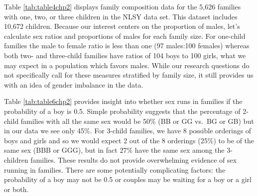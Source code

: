 \documentclass[
]{krantz}
\begin{document}
\begin{table}

\caption{\label{tab:table4chp2}Number of families and children in families with given composition in NLSY data. Sex ratio and proportion males are given by family size.}
\centering
{}
\end{table}

Table \ref{tab:table4chp2} displays family composition data for the 5,626 families with one, two, or three children in the NLSY data set. This dataset includes 10,672 children. Because our interest centers on the proportion of males, let's calculate sex ratios and proportions of males for each family size. For one-child families the male to female ratio is less than one (97 males:100 females) whereas both two- and three-child families have ratios of 104 boys to 100 girls, what we may expect in a population which favors males. While our research questions do not specifically call for these measures stratified by family size, it still provides us with an idea of gender imbalance in the data.

Table \ref{tab:table6chp2} provides insight into whether sex runs in families if the probability of a boy is 0.5. Simple probability suggests that the percentage of 2-child families with all the same sex would be 50\% (BB or GG vs.~BG or GB) but in our data we see only 45\%. For 3-child families, we have 8 possible orderings of boys and girls and so we would expect 2 out of the 8 orderings (25\%) to be of the same sex (BBB or GGG), but in fact 27\% have the same sex among the 3-children families. These results do not provide overwhelming evidence of sex running in families. There are some potentially complicating factors: the probability of a boy may not be 0.5 or couples may be waiting for a boy or a girl or both.
\end{document}
